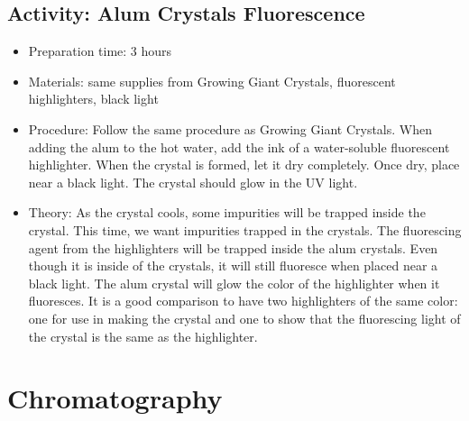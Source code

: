 \begin{itemize}
{\subsection{Activity: Alum Crystals Fluorescence }
\begin{itemize}
\item{Preparation time: 3 hours}
\item{Materials: same supplies from Growing Giant Crystals, fluorescent highlighters, black light}
\item{Procedure: Follow the same procedure as Growing Giant Crystals. When adding the alum to the hot water, add the ink of a water-soluble fluorescent highlighter. When the crystal is formed, let it dry completely. Once dry, place near a black light. The crystal should glow in the UV light.}
\item{Theory: As the crystal cools, some impurities will be trapped inside the crystal. This time, we want impurities trapped in the crystals. The fluorescing agent from the highlighters will be trapped inside the alum crystals. Even though it is inside of the crystals, it will still fluoresce when placed near a black light. The alum crystal will glow the color of the highlighter when it fluoresces. It is a good comparison to have two highlighters of the same color: one for use in making the crystal and one to show that the fluorescing light of the crystal is the same as the highlighter.}
\end{itemize}

\section{Chromatography}

}
\end{itemize}
